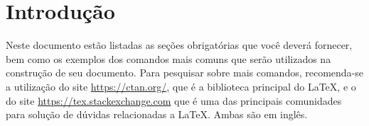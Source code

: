 	\section{Introdução}
	
    Neste documento estão listadas as seções obrigatórias que você deverá fornecer, bem como os exemplos dos comandos mais comuns que serão utilizados na construção de seu documento. Para pesquisar sobre mais comandos, recomenda-se a utilização do site \url{https://ctan.org/}, que é a biblioteca principal do \LaTeX, e o do site \url{https://tex.stackexchange.com} que é uma das principais comunidades para solução de dúvidas relacionadas a \LaTeX. Ambas são em inglês.	
    
    

